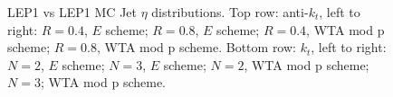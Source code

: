 \begin{figure}[H]
\hfill
{}\hfill
{}\hfill
\caption{LEP1 vs LEP1 MC Jet $\eta$ distributions. Top row: anti-$k_t$, left to right: $R=0.4$, $E$ scheme; $R=0.8$, $E$ scheme; $R=0.4$, WTA mod p scheme; $R=0.8$, WTA mod p scheme. Bottom row: $k_t$, left to right: $N=2$, $E$ scheme; $N=3$, $E$ scheme; $N=2$, WTA mod p scheme; $N=3$; WTA mod p scheme.}  
\end{figure}

